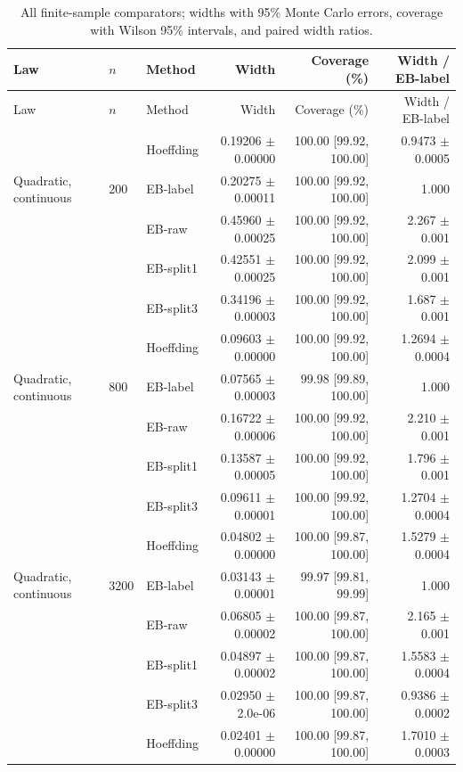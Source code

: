 \begingroup
\scriptsize
\begin{longtable}{lllrrr}
\caption{All finite-sample comparators; widths with 95\% Monte Carlo errors, coverage with Wilson 95\% intervals, and paired width ratios.}\\
\toprule
Law & $n$ & Method & Width & Coverage (\%) & Width / EB-label \\
\midrule
\endfirsthead
\toprule
Law & $n$ & Method & Width & Coverage (\%) & Width / EB-label \\
\midrule
\endhead
 &  & Hoeffding & 0.19206 $\pm$ 0.00000 & 100.00 [99.92, 100.00] & 0.9473 $\pm$ 0.0005 \\
Quadratic, continuous & 200 & EB-label & 0.20275 $\pm$ 0.00011 & 100.00 [99.92, 100.00] & 1.000 \\
 &  & EB-raw & 0.45960 $\pm$ 0.00025 & 100.00 [99.92, 100.00] & 2.267 $\pm$ 0.001 \\
 &  & EB-split1 & 0.42551 $\pm$ 0.00025 & 100.00 [99.92, 100.00] & 2.099 $\pm$ 0.001 \\
 &  & EB-split3 & 0.34196 $\pm$ 0.00003 & 100.00 [99.92, 100.00] & 1.687 $\pm$ 0.001 \\
 &  & Hoeffding & 0.09603 $\pm$ 0.00000 & 100.00 [99.92, 100.00] & 1.2694 $\pm$ 0.0004 \\
Quadratic, continuous & 800 & EB-label & 0.07565 $\pm$ 0.00003 & 99.98 [99.89, 100.00] & 1.000 \\
 &  & EB-raw & 0.16722 $\pm$ 0.00006 & 100.00 [99.92, 100.00] & 2.210 $\pm$ 0.001 \\
 &  & EB-split1 & 0.13587 $\pm$ 0.00005 & 100.00 [99.92, 100.00] & 1.796 $\pm$ 0.001 \\
 &  & EB-split3 & 0.09611 $\pm$ 0.00001 & 100.00 [99.92, 100.00] & 1.2704 $\pm$ 0.0004 \\
 &  & Hoeffding & 0.04802 $\pm$ 0.00000 & 100.00 [99.87, 100.00] & 1.5279 $\pm$ 0.0004 \\
Quadratic, continuous & 3200 & EB-label & 0.03143 $\pm$ 0.00001 & 99.97 [99.81, 99.99] & 1.000 \\
 &  & EB-raw & 0.06805 $\pm$ 0.00002 & 100.00 [99.87, 100.00] & 2.165 $\pm$ 0.001 \\
 &  & EB-split1 & 0.04897 $\pm$ 0.00002 & 100.00 [99.87, 100.00] & 1.5583 $\pm$ 0.0004 \\
 &  & EB-split3 & 0.02950 $\pm$ 2.0e-06 & 100.00 [99.87, 100.00] & 0.9386 $\pm$ 0.0002 \\
 &  & Hoeffding & 0.02401 $\pm$ 0.00000 & 100.00 [99.87, 100.00] & 1.7010 $\pm$ 0.0003 \\

\end{longtable}
